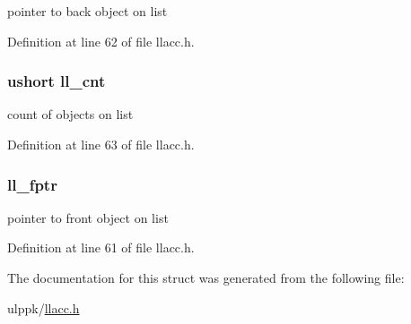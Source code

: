 pointer to back object on list 



Definition at line 62 of file llacc.\-h.

\hypertarget{struct_l_l___h_e_a_d_a93421b80d51d8e167ae35c25bed52ddf}{
\subsubsection[{ll\-\_\-cnt}]{\setlength{\rightskip}{0pt plus 5cm}ushort ll\-\_\-cnt}}\label{struct_l_l___h_e_a_d_a93421b80d51d8e167ae35c25bed52ddf}


count of objects on list 



Definition at line 63 of file llacc.\-h.

\hypertarget{struct_l_l___h_e_a_d_abca293007231e28e54ebc3513a42aa95}{
\subsubsection[{ll\-\_\-fptr}]{ ll\-\_\-fptr}}\label{struct_l_l___h_e_a_d_abca293007231e28e54ebc3513a42aa95}


pointer to front object on list 



Definition at line 61 of file llacc.\-h.



The documentation for this struct was generated from the following file\-:\begin{DoxyCompactItemize}
\item 
ulppk/\hyperlink{llacc_8h}{llacc.\-h}\end{DoxyCompactItemize}
